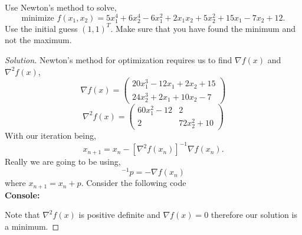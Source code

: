 \documentclass[12pt]{article}
\makeatletter
\theoremstyle{homework}
\newenvironment{exercise}[1]
{\def\@currentlabel{#1}\exercisecore}
{\endexercisecore}
\makeatother
\begin{document}
\begin{exercise}{3.3} Use Newton's method to solve, 
  \begin{equation*}
    \text{minimize } f(x_1, x_2) = 5x_1^4 + 6x_2^4 - 6x_1^2 + 2x_1x_2 + 5x_2^2 + 15x_1 - 7x_2 + 12.
  \end{equation*}
  Use the initial guess $(1, 1)^T$. Make sure that you have found the minimum and not the maximum. 
  \begin{proof}[Solution] Newton's method for optimization requires us to find $\nabla f(x)$ and $\nabla^2 f(x)$, 
    \begin{equation*}
      \nabla f(x) = 
      \begin{pmatrix}
        20x_1^3 - 12x_1 + 2x_2 + 15\\
        24x_2^3 + 2x_1 + 10x_2 - 7
      \end{pmatrix}
    \end{equation*}
    \begin{equation*}
      \nabla^2 f(x) = 
      \begin{pmatrix}
        60x_1^2 - 12 & 2\\
        2 & 72x_2^2 + 10
      \end{pmatrix}
    \end{equation*}
    With our iteration being, 
    \begin{equation*}
      x_{n + 1} = x_n - [\nabla^2 f(x_n)]^{-1} \nabla f(x_n).
    \end{equation*}
    Really we are going to be using, 
    \begin{equation*}
      [\nabla^2 f(x_n)]^{-1}p = -\nabla f(x_n)
    \end{equation*}
    where $x_{n + 1} = x_n + p$. Consider the following code\\
    \textbf{Console:}
    \begin{center}
      
    \end{center}
    Note that $\nabla^2 f(x)$ is positive definite and $\nabla f(x) = 0$ therefore our solution is a minimum.
  \end{proof}
\end{exercise}
\vspace{.5in}
\end{document}
